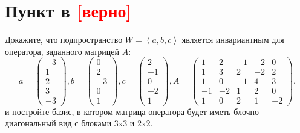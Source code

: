 \documentclass[12pt]{article}
\begin{document}
    \section*{Пункт в \textcolor{red}{[верно]}}
    Докажите, что подпространство $W = \left < a, b, c \right >$ является инвариантным для оператора, заданного матрицей $A$:
    \[
        a  = \begin{pmatrix}
                 -3 \\ 1 \\ 2 \\ 3 \\ -3
        \end{pmatrix} ,
        b = \begin{pmatrix}
                0 \\ 2 \\ -3 \\ 0 \\ 1
        \end{pmatrix},
        c = \begin{pmatrix}
                2 \\ -1 \\ 0 \\ -2 \\ 1
        \end{pmatrix},
        A =
        \begin{pmatrix}
            1  & 2  & -1 & -2 & 0  \\
            1  & 3  & 2  & -2 & 2  \\
            1  & 0  & -1 & 4  & 3  \\
            -1 & -2 & 1  & 2  & 0  \\
            1  & 0  & 2  & 1  & -2
        \end{pmatrix}
        .
    \]
    и постройте базис, в котором матрица оператора будет иметь блочно-диагональный вид с блоками 3x3 и 2x2.
\end{document}
